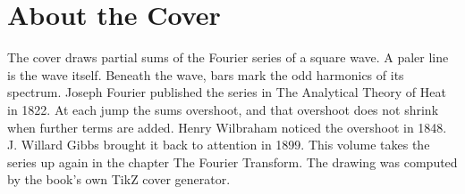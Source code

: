 \backmatter
\cleardoublepage
\chapter*{About the Cover}
\noindent The cover draws partial sums of the Fourier series of a square wave. A paler line is the wave itself. Beneath the wave, bars mark the odd harmonics of its spectrum. Joseph Fourier published the series in The Analytical Theory of Heat in 1822. At each jump the sums overshoot, and that overshoot does not shrink when further terms are added. Henry Wilbraham noticed the overshoot in 1848. J. Willard Gibbs brought it back to attention in 1899. This volume takes the series up again in the chapter The Fourier Transform. The drawing was computed by the book's own TikZ cover generator.
